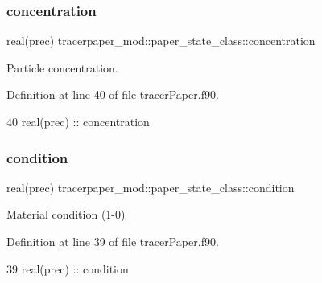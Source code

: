 \subsubsection{\texorpdfstring{concentration}{concentration}}
{\footnotesize\ttfamily real(prec) tracerpaper\+\_\+mod\+::paper\+\_\+state\+\_\+class\+::concentration\hspace{0.3cm}{\ttfamily [private]}}



Particle concentration. 



Definition at line 40 of file tracer\+Paper.\+f90.


\begin{DoxyCode}
40         \textcolor{keywordtype}{real(prec)} :: concentration
\end{DoxyCode}
\mbox{\label{structtracerpaper__mod_1_1paper__state__class_a8821f663963b1a995fb720b63093fea7}} 
\subsubsection{\texorpdfstring{condition}{condition}}
{\footnotesize\ttfamily real(prec) tracerpaper\+\_\+mod\+::paper\+\_\+state\+\_\+class\+::condition\hspace{0.3cm}{\ttfamily [private]}}



Material condition (1-\/0) 



Definition at line 39 of file tracer\+Paper.\+f90.


\begin{DoxyCode}
39         \textcolor{keywordtype}{real(prec)} :: condition
\end{DoxyCode}
\mbox{\label{structtracerpaper__mod_1_1paper__state__class_a87732840a207f7c0227040cf56f40441}} 
